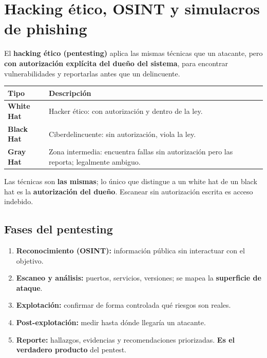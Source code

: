 \documentclass[12pt,a4paper]{article}
\begin{document}
\section{Hacking \'etico, OSINT y simulacros de phishing}

\begin{cajaDefinicion}
El \textbf{hacking \'etico (pentesting)} aplica las mismas t\'ecnicas que un atacante,
pero \textbf{con autorizaci\'on expl\'icita del due\~no del sistema}, para encontrar
vulnerabilidades y reportarlas antes que un delincuente.
\end{cajaDefinicion}

\begin{tabularx}{\textwidth}{|>{\bfseries}p{3.2cm}|X|}
\hline
\rowcolor{grisClaro}
Tipo & Descripci\'on \\
\hline
White Hat & Hacker \'etico: con autorizaci\'on y dentro de la ley. \\
\hline
Black Hat & Ciberdelincuente: sin autorizaci\'on, viola la ley. \\
\hline
Gray Hat & Zona intermedia: encuentra fallas sin autorizaci\'on pero las reporta; legalmente ambiguo. \\
\hline
\end{tabularx}

\begin{cajaNota}[title={La l\'inea divisoria es el consentimiento}]
Las t\'ecnicas son \textbf{las mismas}; lo \'unico que distingue a un white hat de
un black hat es la \textbf{autorizaci\'on del due\~no}. Escanear sin autorizaci\'on
escrita es acceso indebido.
\end{cajaNota}

\subsection{Fases del pentesting}
\begin{enumerate}
  \item \textbf{Reconocimiento (OSINT):} informaci\'on p\'ublica sin interactuar con el objetivo.
  \item \textbf{Escaneo y an\'alisis:} puertos, servicios, versiones; se mapea la \textbf{superficie de ataque}.
  \item \textbf{Explotaci\'on:} confirmar de forma controlada qu\'e riesgos son reales.
  \item \textbf{Post-explotaci\'on:} medir hasta d\'onde llegar\'ia un atacante.
  \item \textbf{Reporte:} hallazgos, evidencias y recomendaciones priorizadas. \textbf{Es el verdadero producto} del pentest.
\end{enumerate}
\end{document}

